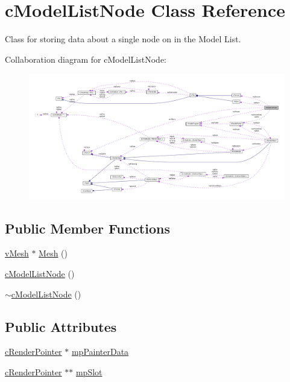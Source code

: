 \hypertarget{classc_model_list_node}{
\section{cModelListNode Class Reference}
\label{classc_model_list_node}
}


Class for storing data about a single node on in the Model List.  




Collaboration diagram for cModelListNode:
\nopagebreak
\begin{figure}[H]
\begin{center}
\leavevmode
\includegraphics[width=400pt]{classc_model_list_node__coll__graph}
\end{center}
\end{figure}
\subsection*{Public Member Functions}
\begin{DoxyCompactItemize}
\item 
\hyperlink{classv_mesh}{vMesh} $\ast$ \hyperlink{classc_model_list_node_a33c104ab19ee55abd1b6207bfd2419ac}{Mesh} ()
\item 
\hyperlink{classc_model_list_node_a60f75a7c8fe88295e4a1fcd5a640cc86}{cModelListNode} ()
\item 
\hyperlink{classc_model_list_node_afbb9c1cdb7f918b2f6d21c8b36135f39}{$\sim$cModelListNode} ()
\end{DoxyCompactItemize}
\subsection*{Public Attributes}
\begin{DoxyCompactItemize}
\item 
\hyperlink{classc_render_pointer}{cRenderPointer} $\ast$ \hyperlink{classc_model_list_node_a13db15948bd957c09fb74362850b1a2d}{mpPainterData}
\item 
\hyperlink{classc_render_pointer}{cRenderPointer} $\ast$$\ast$ \hyperlink{classc_model_list_node_af6e6813a26fce02b37dc9fabeab059e6}{mpSlot}
\end{DoxyCompactItemize}
